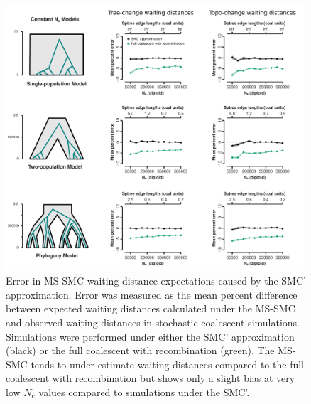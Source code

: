 \documentclass[11pt]{article}
\begin{document}
\begin{figure}[p]
	\centering
	\includegraphics[width=0.99\textwidth]{figures/error-smc-approx.pdf}
	\caption{
		Error in MS-SMC waiting distance expectations caused by the 
		SMC' approximation. Error was measured as the mean percent 
		difference between expected waiting distances calculated
		under the MS-SMC and observed waiting distances in stochastic 
		coalescent simulations. Simulations were performed under either 
		the SMC' approximation (black) or the full coalescent 
		with recombination (green). The MS-SMC tends to under-estimate 
		waiting distances compared to the full coalescent with recombination 
		but shows only a slight bias at very low $N_e$ values compared to 
		simulations under the SMC'. 
	}
     \label{fig:figS-bias-smc}
\end{figure}
\end{document}
